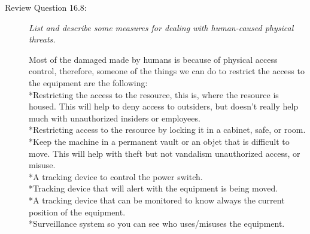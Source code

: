 \documentclass[12pt]{article}
\begin{document}
\begin{description}
\item[Review Question 16.8:] {\color{grey}\textit{List and describe some measures for dealing with human-caused physical threats.}} \par
Most of the damaged made by humans is because of physical access control, therefore, someone of the things we can do to restrict the access to the equipment are the following: \\
*Restricting the access to the resource, this is, where the resource is housed. This will help to deny access to outsiders, but doesn't really help much with unauthorized insiders or employees. \\
*Restricting access to the resource by locking it in a cabinet, safe, or room. \\ *Keep the machine in a permanent vault or an objet that is difficult to move. This will help with theft but not vandalism unauthorized access, or misuse. \\ *A tracking device to control the power switch. \\*Tracking device that will alert with the equipment is being moved. \\ *A tracking device that can be monitored to know always the current position of the equipment. \\ *Surveillance system so you can see who uses/misuses the equipment. 
\end{description}
\end{document}
